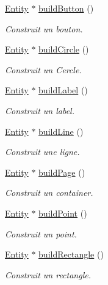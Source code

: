 \begin{DoxyCompactItemize}
\item 
\hyperlink{class_entity}{Entity} $\ast$ \hyperlink{class_factory_a02b9acfeff809af13a4468b45439a6b0}{build\+Button} ()
\begin{DoxyCompactList}\small\item\em Construit un bouton. \end{DoxyCompactList}\item 
\hyperlink{class_entity}{Entity} $\ast$ \hyperlink{class_factory_ac36af1255623013da858e419dfd6dcee}{build\+Circle} ()
\begin{DoxyCompactList}\small\item\em Construit un Cercle. \end{DoxyCompactList}\item 
\hyperlink{class_entity}{Entity} $\ast$ \hyperlink{class_factory_a9b810e510d0a17c3b97261267464babf}{build\+Label} ()
\begin{DoxyCompactList}\small\item\em Construit un label. \end{DoxyCompactList}\item 
\hyperlink{class_entity}{Entity} $\ast$ \hyperlink{class_factory_a322d133508a7d1bf2f36e22a469d99dd}{build\+Line} ()
\begin{DoxyCompactList}\small\item\em Construit une ligne. \end{DoxyCompactList}\item 
\hyperlink{class_entity}{Entity} $\ast$ \hyperlink{class_factory_a7c4d86337c68ef9a9c541414a76f5a01}{build\+Page} ()
\begin{DoxyCompactList}\small\item\em Construit un container. \end{DoxyCompactList}\item 
\hyperlink{class_entity}{Entity} $\ast$ \hyperlink{class_factory_ae706dae61b1fb221fb930f1a36d2cc76}{build\+Point} ()
\begin{DoxyCompactList}\small\item\em Construit un point. \end{DoxyCompactList}\item 
\hyperlink{class_entity}{Entity} $\ast$ \hyperlink{class_factory_a5355c2462e4bd2e8a986567528108683}{build\+Rectangle} ()
\begin{DoxyCompactList}\small\item\em Construit un rectangle. \end{DoxyCompactList}\item 

\end{DoxyCompactItemize}
